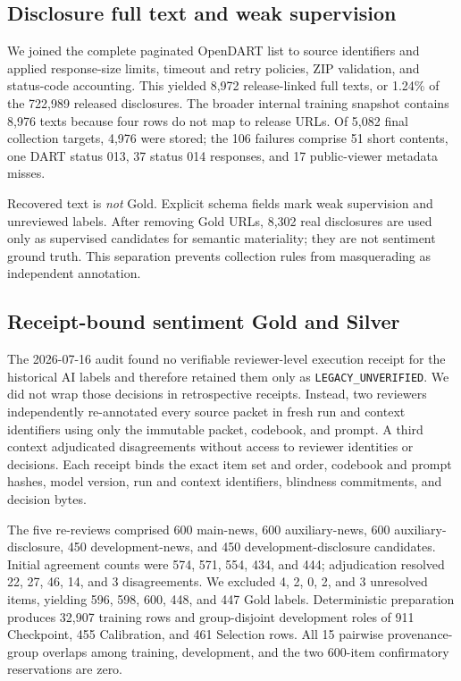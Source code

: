 \documentclass[11pt]{article}
\begin{document}
\subsection{Disclosure full text and weak supervision}

We joined the complete paginated OpenDART list to source identifiers and applied response-size limits, timeout and retry policies, ZIP validation, and status-code accounting. This yielded 8,972 release-linked full texts, or 1.24\% of the 722,989 released disclosures. The broader internal training snapshot contains 8,976 texts because four rows do not map to release URLs. Of 5,082 final collection targets, 4,976 were stored; the 106 failures comprise 51 short contents, one DART status 013, 37 status 014 responses, and 17 public-viewer metadata misses.

Recovered text is \emph{not} Gold. Explicit schema fields mark weak supervision and unreviewed labels. After removing Gold URLs, 8,302 real disclosures are used only as supervised candidates for semantic materiality; they are not sentiment ground truth. This separation prevents collection rules from masquerading as independent annotation.

\subsection{Receipt-bound sentiment Gold and Silver}

The 2026-07-16 audit found no verifiable reviewer-level execution receipt for the historical AI labels and therefore retained them only as \texttt{LEGACY\_UNVERIFIED}. We did not wrap those decisions in retrospective receipts. Instead, two reviewers independently re-annotated every source packet in fresh run and context identifiers using only the immutable packet, codebook, and prompt. A third context adjudicated disagreements without access to reviewer identities or decisions. Each receipt binds the exact item set and order, codebook and prompt hashes, model version, run and context identifiers, blindness commitments, and decision bytes.

The five re-reviews comprised 600 main-news, 600 auxiliary-news, 600 auxiliary-disclosure, 450 development-news, and 450 development-disclosure candidates. Initial agreement counts were 574, 571, 554, 434, and 444; adjudication resolved 22, 27, 46, 14, and 3 disagreements. We excluded 4, 2, 0, 2, and 3 unresolved items, yielding 596, 598, 600, 448, and 447 Gold labels. Deterministic preparation produces 32,907 training rows and group-disjoint development roles of 911 Checkpoint, 455 Calibration, and 461 Selection rows. All 15 pairwise provenance-group overlaps among training, development, and the two 600-item confirmatory reservations are zero.
\end{document}
